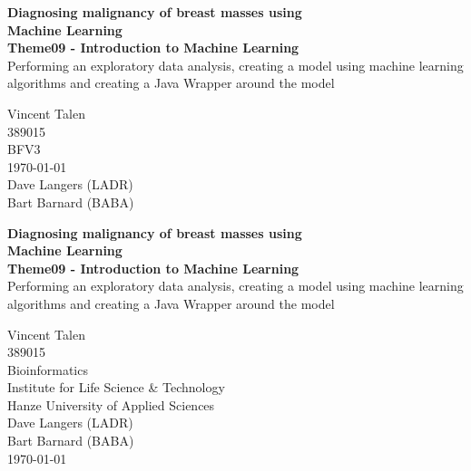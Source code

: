 


\begin{center}
  \topskip=45pt
  \LARGE{\textbf{Diagnosing malignancy of breast masses using\\Machine Learning}}\\
  \vspace*{20pt}
  \large{\textbf{Theme09 - Introduction to Machine Learning}}\\
  \large{Performing an exploratory data analysis, creating a model using machine learning algorithms and creating a Java Wrapper around the model}\\
  \vspace*{40pt}
\end{center}
\vspace*{\fill}
\begin{flushright}
  Vincent Talen\\
  389015\\
  BFV3\\
  \today\\
  Dave Langers (LADR)\\
  Bart Barnard (BABA)\\
\end{flushright}


\newpage
\null


\newpage
\begin{center}
  \topskip=45pt
  \LARGE{\textbf{Diagnosing malignancy of breast masses using\\Machine Learning}}\\
  \vspace*{20pt}
  \large{\textbf{Theme09 - Introduction to Machine Learning}}\\
  \large{Performing an exploratory data analysis, creating a model using machine learning algorithms and creating a Java Wrapper around the model}\\
\end{center}
\vspace*{\fill}
\begin{flushright}
  Vincent Talen\\
  389015\\
  Bioinformatics\\
  Institute for Life Science \& Technology\\
  Hanze University of Applied Sciences\\
  Dave Langers (LADR)\\
  Bart Barnard (BABA)\\
  \today\\
\end{flushright}


